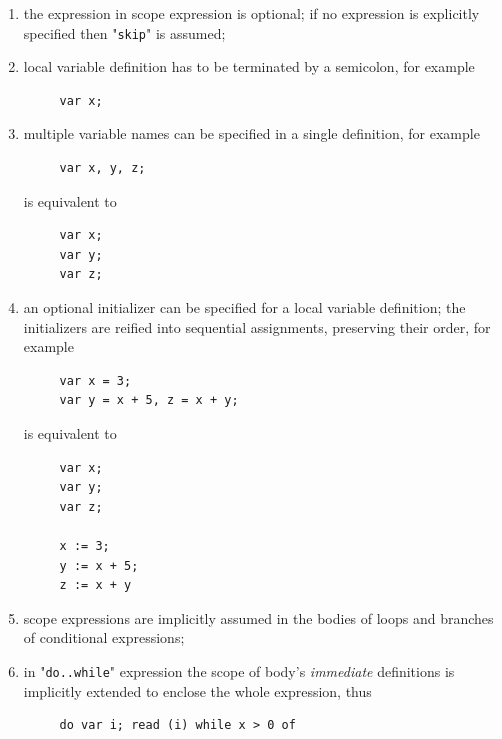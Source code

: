 \documentclass{article}
\theoremstyle{definition}
\begin{document}
\begin{enumerate}
\item the expression in scope expression is optional; if no expression is explicitly specified then "\lstinline|skip|" is assumed;
\item local variable definition has to be terminated by a semicolon, for example

  \begin{lstlisting}
     var x;
  \end{lstlisting}

\item multiple variable names can be specified in a single definition, for example

  \begin{lstlisting}
     var x, y, z;
  \end{lstlisting}

  is equivalent to

  \begin{lstlisting}
     var x;
     var y;
     var z;
  \end{lstlisting}

\item an optional initializer can be specified for a local variable definition; the initializers are reified into sequential assignments,
  preserving their order, for example

  \begin{lstlisting}
     var x = 3;
     var y = x + 5, z = x + y;
  \end{lstlisting}

  is equivalent to

  \begin{lstlisting}
     var x;
     var y;
     var z;

     x := 3;
     y := x + 5;
     z := x + y
  \end{lstlisting}

\item scope expressions are implicitly assumed in the bodies of loops and branches of conditional expressions;

\item in "\lstinline|do..while|" expression the scope of body's \emph{immediate} definitions is implicitly extended to enclose the
  whole expression, thus

  \begin{lstlisting}
     do var i; read (i) while x > 0 of
  \end{lstlisting}


\end{enumerate}
\end{document}
